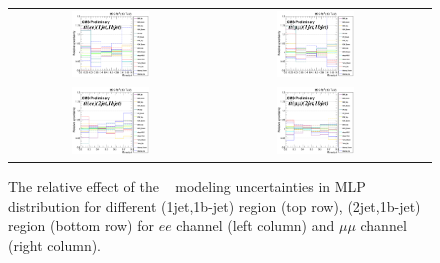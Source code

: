 \begin{figure}[ht]
  \begin{center}
    \begin{tabular}{ccc}
      \includegraphics[width=0.4\textwidth]{figures/tW/fig/Step2/uncertainties/ee/TT_Samples_H_MLP_1jet_1bjet_comb.png} &
      \includegraphics[width=0.4\textwidth]{figures/tW/fig/Step2/uncertainties/mumu/TT_Samples_H_MLP_1jet_1bjet_comb.png}\\
      \includegraphics[width=0.4\textwidth]{figures/tW/fig/Step2/uncertainties/ee/TT_Samples_H_MLP_2jet_1bjet_comb.png} &
      \includegraphics[width=0.4\textwidth]{figures/tW/fig/Step2/uncertainties/mumu/TT_Samples_H_MLP_2jet_1bjet_comb.png}\\
    \end{tabular}
    \caption{The relative effect of the \ttbar~ modeling uncertainties in MLP distribution for different (1jet,1b-jet) region (top row), (2jet,1b-jet) region (bottom row) for $ee$ channel (left column) and $\mu\mu$ channel (right column).
    \label{fig:uncert_TT}}
  \end{center}
\end{figure}


